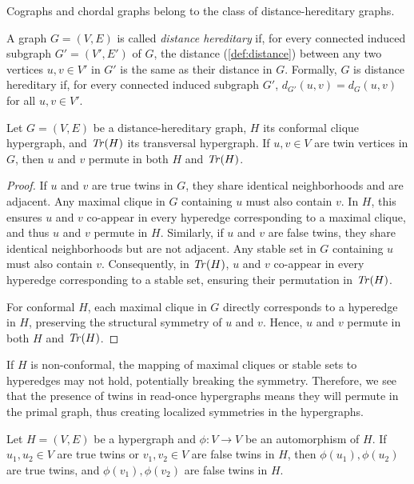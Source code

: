 Cographs and chordal graphs belong to the class of distance-hereditary graphs.

\begin{definition}
A graph $G=(V,E)$ is called \emph{distance hereditary} if, for every connected induced subgraph $G'=(V',E')$ of $G$, the distance (\ref{def:distance}) between any two vertices $u,v\in V'$ in $G'$ is the same as their distance in $G$. Formally, $G$ is distance hereditary if, for every connected induced subgraph $G'$, $d_{G'}(u,v)=d_G(u,v)$ for all $u,v\in V'$.
\end{definition}

\begin{lemma}\label{lem:twins-permute}
Let $G=(V,E)$ be a distance-hereditary graph, $H$ its conformal clique hypergraph, and $\mathit{Tr}(H)$ its transversal hypergraph. If $u,v\in V$ are twin vertices in $G$, then $u$ and $v$ permute in both $H$ and $\mathit{Tr}(H)$. \cite{Tim13}
\end{lemma}

\begin{proof}
If $u$ and $v$ are true twins in $G$, they share identical neighborhoods and are adjacent. Any maximal clique in $G$ containing $u$ must also contain $v$. In $H$, this ensures $u$ and $v$ co-appear in every hyperedge corresponding to a maximal clique, and thus $u$ and $v$ permute in $H$. Similarly, if $u$ and $v$ are false twins, they share identical neighborhoods but are not adjacent. Any stable set in $G$ containing $u$ must also contain $v$. Consequently, in $\mathit{Tr}(H)$, $u$ and $v$ co-appear in every hyperedge corresponding to a stable set, ensuring their permutation in $\mathit{Tr}(H)$.

For conformal $H$, each maximal clique in $G$ directly corresponds to a hyperedge in $H$, preserving the structural symmetry of $u$ and $v$. Hence, $u$ and $v$ permute in both $H$ and $\mathit{Tr}(H)$.
\end{proof}

If $H$ is non-conformal, the mapping of maximal cliques or stable sets to hyperedges may not hold, potentially breaking the symmetry. Therefore, we see that the presence of twins in read-once hypergraphs means they will permute in the primal graph, thus creating localized symmetries in the hypergraphs.

\begin{lemma}\label{lem:twins-map}
Let $H=(V,E)$ be a hypergraph and $\phi:V\to V$ be an automorphism of $H$. If $u_1,u_2\in V$ are true twins or $v_1,v_2\in V$ are false twins in $H$, then $\phi(u_1),\phi(u_2)$ are true twins, and $\phi(v_1),\phi(v_2)$ are false twins in $H$.
\end{lemma}

